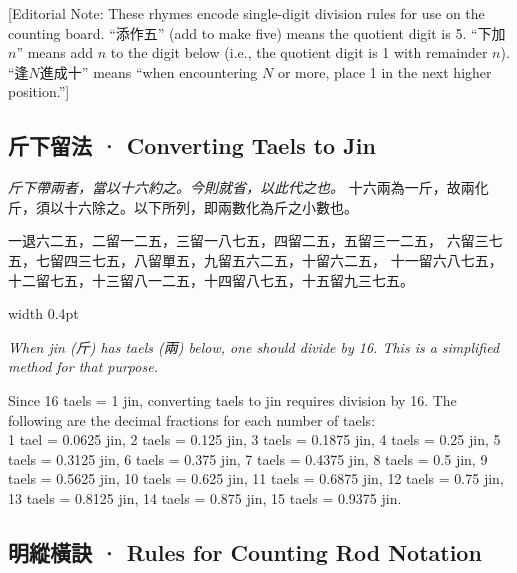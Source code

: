 \documentclass[10pt,a4paper]{article}
\newlength{\cnwidth}
\newlength{\enwidth}
\newcommand{\bilingual}[2]{%
  \noindent%
  \begin{minipage}[t]{\cnwidth}%
    #1%
  \end{minipage}%
  \hfill\vrule width 0.4pt\hfill%
  \begin{minipage}[t]{\enwidth}%
    #2%
  \end{minipage}%
  \par\smallskip%
}
\newcommand{\bilingualsubsection}[2]{%
  \subsection*{#1 · #2}
}
\newcommand{\transnote}[1]{%
  \par\smallskip\noindent\textcolor{notecolor}{\small[Editorial Note: #1]}\par\smallskip
}
\begin{document}
\transnote{These rhymes encode single-digit division rules for use on the counting board.
``添作五'' (add to make five) means the quotient digit is 5. ``下加$n$'' means add $n$
to the digit below (i.e., the quotient digit is 1 with remainder $n$). ``逢$N$進成十''
means ``when encountering $N$ or more, place 1 in the next higher position.''}

\bilingualsubsection{斤下留法}{Converting Taels to Jin}

\bilingual{%
  \textit{斤下帶兩者，當以十六約之。今則就省，以此代之也。}
  十六兩為一斤，故兩化斤，須以十六除之。以下所列，即兩數化為斤之小數也。

  一退六二五，二留一二五，三留一八七五，四留二五，五留三一二五，
  六留三七五，七留四三七五，八留單五，九留五六二五，十留六二五，
  十一留六八七五，十二留七五，十三留八一二五，十四留八七五，十五留九三七五。
}{%
  \textit{When jin (斤) has taels (兩) below, one should divide by 16. This is a simplified
  method for that purpose.}

  Since 16 taels = 1 jin, converting taels to jin requires division by 16.
  The following are the decimal fractions for each number of taels:\\
  1 tael = 0.0625 jin, 2 taels = 0.125 jin, 3 taels = 0.1875 jin,
  4 taels = 0.25 jin, 5 taels = 0.3125 jin, 6 taels = 0.375 jin,
  7 taels = 0.4375 jin, 8 taels = 0.5 jin, 9 taels = 0.5625 jin,
  10 taels = 0.625 jin, 11 taels = 0.6875 jin, 12 taels = 0.75 jin,
  13 taels = 0.8125 jin, 14 taels = 0.875 jin, 15 taels = 0.9375 jin.
}


\bilingualsubsection{明縱橫訣}{Rules for Counting Rod Notation}
\end{document}
